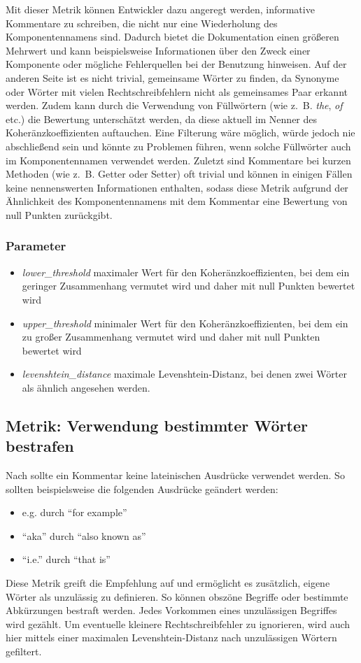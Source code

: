 Mit dieser Metrik können Entwickler dazu angeregt werden, informative Kommentare zu schreiben, die nicht nur eine Wiederholung des Komponentennamens sind. Dadurch bietet die Dokumentation einen größeren Mehrwert und kann beispielsweise Informationen über den Zweck einer Komponente oder mögliche Fehlerquellen bei der Benutzung hinweisen. Auf der anderen Seite ist es nicht trivial, gemeinsame Wörter zu finden, da Synonyme oder Wörter mit vielen Rechtschreibfehlern nicht als gemeinsames Paar erkannt werden. Zudem  kann durch die Verwendung von Füllwörtern (wie z.~B. \textit{the}, \textit{of} etc.) die Bewertung unterschätzt werden, da diese aktuell im Nenner des Koheränzkoeffizienten auftauchen. Eine Filterung wäre möglich, würde jedoch nie abschließend sein und könnte zu Problemen führen, wenn solche Füllwörter auch im Komponentennamen verwendet werden. Zuletzt sind Kommentare bei kurzen Methoden (wie z.~B. Getter oder Setter) oft trivial und können in einigen Fällen keine nennenswerten Informationen enthalten, sodass diese Metrik aufgrund der Ähnlichkeit des Komponentennamens mit dem Kommentar eine Bewertung von null Punkten zurückgibt. 

  \subsubsection{Parameter}
  \begin{itemize}
     \item \textit{lower\_threshold} maximaler Wert für den  Koheränzkoeffizienten, bei dem ein geringer Zusammenhang vermutet wird und daher mit null Punkten bewertet wird
    \item \textit{upper\_threshold} minimaler Wert für den  Koheränzkoeffizienten, bei dem ein zu großer Zusammenhang vermutet wird und daher mit null Punkten bewertet wird
\item \textit{levenshtein\_distance} maximale Levenshtein-Distanz, bei denen zwei Wörter als ähnlich angesehen werden. 
 \end{itemize}
\subsection{Metrik: Verwendung bestimmter Wörter bestrafen}\label{chapter:metric_certain_words}
Nach \cite{HowtoWriteDocCommentsfortheJavadocTool} sollte ein Kommentar keine lateinischen Ausdrücke verwendet werden. So sollten beispielsweise die folgenden Ausdrücke geändert werden:
\begin{itemize}
    \item {e.g.} durch \enquote{for example}
    \item \enquote{aka} durch \enquote{also known as}
    \item \enquote{i.e.} durch \enquote{that is} 
    
\end{itemize}
Diese Metrik greift die Empfehlung auf und ermöglicht es zusätzlich, eigene Wörter als unzulässig zu definieren. So können obszöne Begriffe oder bestimmte Abkürzungen bestraft werden. Jedes Vorkommen eines unzulässigen Begriffes wird gezählt. Um eventuelle kleinere Rechtschreibfehler zu ignorieren, wird auch hier mittels einer maximalen Levenshtein-Distanz nach unzulässigen Wörtern gefiltert.

